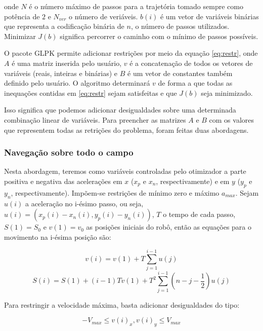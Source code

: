 \documentclass[a4paper,12pt]{article}
\begin{document}
onde $N$ é o número máximo de passos para a trajetória tomado sempre como potência de $2$ e $N_{ver}$ o número de veriáveis. $b(i)$ é um vetor de variáveis binárias que representa a codificação binária de $n$, o número de passos utilizados. Minimizar $J(b)$ significa percorrer o caminho com o mínimo de passos possíveis.

O pacote GLPK permite adicionar restrições por meio da equação \eqref{eq:restr}, onde $A$ é uma matriz inserida pelo usuário, $v$ é a concatenação de todos os vetores de variáveis (reais, inteiras e binárias) e $B$ é um vetor de constantes também definido pelo usuário. O algoritmo determinará $v$ de forma a que todas as inequações contidas em \eqref{eq:restr} sejam satisfeitas e que $J(b)$ seja minimizado.

Isso significa que podemos adicionar desigualdades sobre uma determinada combinação linear de variáveis. Para preencher as matrizes $A$ e $B$ com os valores que representem todas as retrições do problema, foram feitas duas abordagens.

\subsubsection{Navegação sobre todo o campo}

Nesta abordagem, teremos como variáveis controladas pelo otimizador a parte positiva e negativa das acelerações em $x$ ($x_{p}$ e $x_{n}$, respectivamente) e em $y$ ($y_{p}$ e $y_{n}$, respectivamente). Impõem-se restrições de mínimo zero e máximo $a_{max}$. Sejam $u(i)$ a aceleração no i-ésimo passo, ou seja, $u(i) = (x_{p}(i)-x_{n}(i), y_{p}(i)-y_{n}(i))$, $T$ o tempo de cada passo, $S(1)=S_{0}$ e $v(1)=v_{0}$ as posições iniciais do robô, então as equações para o movimento na i-ésima posição são:

\begin{equation}
	v(i) = v(1) + T\sum_{j=1}^{i-1}u(j)
\end{equation}
\begin{equation}
	S(i) = S(1) + (i-1)Tv(1) + T^2\sum_{j=1}^{i-1}(n-j-\frac{1}{2})u(j)
\end{equation}

Para restringir a velocidade máxima, basta adicionar desigualdades do tipo:

\begin{equation}
	-V_{max} \leq v(i)_x, v(i)_y \leq V_{max}
\end{equation}
\end{document}
